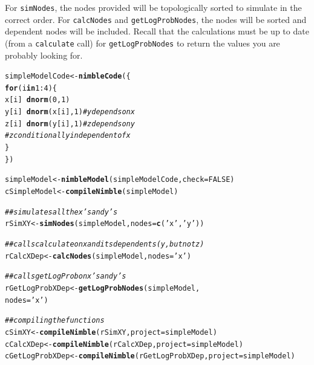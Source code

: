\documentclass[12pt,oneside]{book}\usepackage[]{graphicx}\usepackage[]{color}
\makeatletter
\newcommand{\hlnum}[1]{\textcolor[rgb]{0.686,0.059,0.569}{#1}}%
\newcommand{\hlstr}[1]{\textcolor[rgb]{0.192,0.494,0.8}{#1}}%
\newcommand{\hlcom}[1]{\textcolor[rgb]{0.678,0.584,0.686}{\textit{#1}}}%
\newcommand{\hlopt}[1]{\textcolor[rgb]{0,0,0}{#1}}%
\newcommand{\hlstd}[1]{\textcolor[rgb]{0.345,0.345,0.345}{#1}}%
\newcommand{\hlkwa}[1]{\textcolor[rgb]{0.161,0.373,0.58}{\textbf{#1}}}%
\newcommand{\hlkwb}[1]{\textcolor[rgb]{0.69,0.353,0.396}{#1}}%
\newcommand{\hlkwc}[1]{\textcolor[rgb]{0.333,0.667,0.333}{#1}}%
\newcommand{\hlkwd}[1]{\textcolor[rgb]{0.737,0.353,0.396}{\textbf{#1}}}%
\newenvironment{kframe}{%
 \def\at@end@of@kframe{}%
 \ifinner\ifhmode%
  \def\at@end@of@kframe{\end{minipage}}%
  \begin{minipage}{\columnwidth}%
 \fi\fi%
 \def\FrameCommand##1{\hskip\@totalleftmargin \hskip-\fboxsep
 \colorbox{shadecolor}{##1}\hskip-\fboxsep
     \hskip-\linewidth \hskip-\@totalleftmargin \hskip\columnwidth}%
 \MakeFramed {\advance\hsize-\width
   \@totalleftmargin\z@ \linewidth\hsize
   \@setminipage}}%
 {\par\unskip\endMakeFramed%
 \at@end@of@kframe}
\newenvironment{knitrout}{}{} %
\def\cd#1{\texttt{#1}}
\makeatother
\begin{document}
  For \cd{simNodes}, the nodes provided will be topologically sorted to 
  simulate in the correct order. For \cd{calcNodes} and \cd{getLogProbNodes},
  the nodes will be sorted and dependent nodes will be included.  Recall that
 the calculations must be up to date (from a \cd{calculate} call) for \cd{getLogProbNodes}
  to return the values you are probably looking for.
  
\begin{knitrout}
\color{fgcolor}\begin{kframe}
\begin{alltt}
\hlstd{simpleModelCode} \hlkwb{<-} \hlkwd{nimbleCode}\hlstd{(\{}
  \hlkwa{for}\hlstd{(i} \hlkwa{in} \hlnum{1}\hlopt{:}\hlnum{4}\hlstd{)\{}
    \hlstd{x[i]} \hlopt{~} \hlkwd{dnorm}\hlstd{(}\hlnum{0}\hlstd{,}\hlnum{1}\hlstd{)}
    \hlstd{y[i]} \hlopt{~} \hlkwd{dnorm}\hlstd{(x[i],} \hlnum{1}\hlstd{)} \hlcom{# y depends on x}
    \hlstd{z[i]} \hlopt{~} \hlkwd{dnorm}\hlstd{(y[i],} \hlnum{1}\hlstd{)} \hlcom{# z depends on y}
    \hlcom{# z conditionally independent of x}
  \hlstd{\}}
\hlstd{\})}

\hlstd{simpleModel} \hlkwb{<-} \hlkwd{nimbleModel}\hlstd{(simpleModelCode,} \hlkwc{check} \hlstd{=} \hlnum{FALSE}\hlstd{)}
\hlstd{cSimpleModel} \hlkwb{<-} \hlkwd{compileNimble}\hlstd{(simpleModel)}

\hlcom{## simulates all the x's and y's}
\hlstd{rSimXY} \hlkwb{<-} \hlkwd{simNodes}\hlstd{(simpleModel,} \hlkwc{nodes} \hlstd{=} \hlkwd{c}\hlstd{(}\hlstr{'x'}\hlstd{,} \hlstr{'y'}\hlstd{) )}

\hlcom{## calls calculate on x and its dependents (y, but not z)}
\hlstd{rCalcXDep} \hlkwb{<-} \hlkwd{calcNodes}\hlstd{(simpleModel,} \hlkwc{nodes} \hlstd{=} \hlstr{'x'}\hlstd{)}

\hlcom{## calls getLogProb on x's and y's}
\hlstd{rGetLogProbXDep} \hlkwb{<-} \hlkwd{getLogProbNodes}\hlstd{(simpleModel,}
                  \hlkwc{nodes} \hlstd{=} \hlstr{'x'}\hlstd{)}

\hlcom{## compiling the functions}
\hlstd{cSimXY} \hlkwb{<-} \hlkwd{compileNimble}\hlstd{(rSimXY,} \hlkwc{project} \hlstd{= simpleModel)}
\hlstd{cCalcXDep} \hlkwb{<-} \hlkwd{compileNimble}\hlstd{(rCalcXDep,} \hlkwc{project} \hlstd{= simpleModel)}
\hlstd{cGetLogProbXDep} \hlkwb{<-} \hlkwd{compileNimble}\hlstd{(rGetLogProbXDep,} \hlkwc{project} \hlstd{= simpleModel)}


\end{alltt}
\end{kframe}
\end{knitrout}
\end{document}
